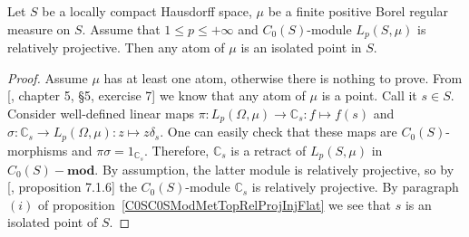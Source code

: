 \begin{proposition}\label{AtomsOfRelProjLpMod} Let $S$ be a locally compact
Hausdorff space, $\mu$ be a finite positive Borel regular measure on $S$. Assume 
that $1\leq p\leq+\infty$ and $C_0(S)$-module $L_p(S,\mu)$ is relatively 
projective. Then any atom of $\mu$ is an isolated point in $S$.
\end{proposition} 
\begin{proof} Assume $\mu$ has at least one atom, otherwise there is nothing to
prove. From [\cite{BourbElemMathIntegLivVI}, chapter 5, \S 5, exercise 7] we
know that any atom of $\mu$ is a point. Call it $s\in S$. Consider well-defined
linear maps $\pi:L_p(\Omega,\mu)\to\mathbb{C}_s:f\mapsto f(s)$ and
$\sigma:\mathbb{C}_s\to L_p(\Omega,\mu):z\mapsto z\delta_s$. One can easily
check that these maps are $C_0(S)$-morphisms and $\pi\sigma=1_{\mathbb{C}_s}$.
Therefore, $\mathbb{C}_s$ is a retract of $L_p(S,\mu)$ in $C_0(S)-\mathbf{mod}$.
By assumption, the latter module is relatively projective, so by
[\cite{HelBanLocConvAlg}, proposition 7.1.6] the $C_0(S)$-module $\mathbb{C}_s$
is relatively projective. By paragraph $(i)$ of
proposition~\ref{C0SC0SModMetTopRelProjInjFlat} we see that $s$ is an isolated
point of $S$.
\end{proof}

